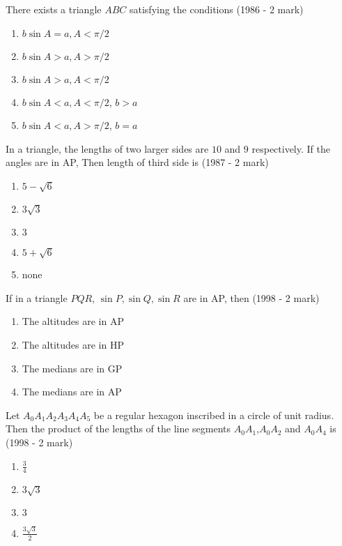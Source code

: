\iffalse
\title{Properties of Triangles}
\author{EE24Btech11022 - Eshan sharma}
\section{mcq-multiple}
\fi
    \item There exists a triangle $ABC$ satisfying the conditions
    \hfill{(1986 - 2 mark)}
    \begin{enumerate}
    	\item $b\sin{A} = a, A <\pi/2$
    	\item $b\sin{A} > a, A >\pi/2$
    	\item $b\sin{A} > a, A <\pi/2$
    	\item $b\sin{A} < a, A <\pi/2$, $b > a$
    	\item $b\sin{A} < a, A >\pi/2$, $b = a$
    \end{enumerate}
    \item In a triangle, the lengths of two larger sides are $10$ and $9$ respectively. If the angles are in AP, Then length of third side is
    \hfill{(1987 - 2 mark)}
    \begin{multicols}{2}
    	\begin{enumerate}
    		\item $5-\sqrt{6}$ 
    		\item $3\sqrt{3}$
    		\item $3$
    		\item $5+\sqrt{6}$ 
    		\item none
    	\end{enumerate}
    \end{multicols}
    \item If in a triangle $PQR$, $\sin{P}, \sin{Q}, \sin{R}$ are in AP, then
    \hfill{(1998 - 2 mark)}
    \begin{enumerate}
    	\item The altitudes are in AP
    	\item The altitudes are in HP
    	\item The medians are in GP
    	\item The medians are in AP
    \end{enumerate}
    \item Let $A_{0}A_{1}A_{2}A_{3}A_{4}A_{5}$ be a regular hexagon inscribed in a circle of unit radius. Then the product of the lengths of the line segments $A_{0}A_{1}$,$A_{0}A_{2}$ and $A_{0}A_{4}$ is 
    \hfill{(1998 - 2 mark)}
    \begin{multicols}{2}
    	\begin{enumerate}
    		\item ${\frac{3}{4}}$
    		\item $3\sqrt{3}$
    		\item $3$
    		\item ${\frac{3\sqrt{3}}{2}}$
    	\end{enumerate}
    \end{multicols}

